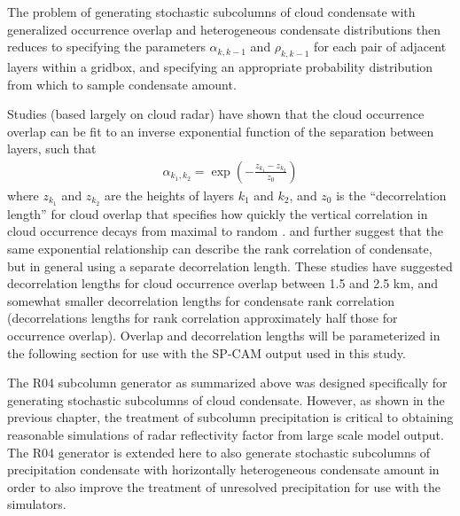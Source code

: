 The problem of generating stochastic subcolumns of cloud condensate with
generalized occurrence overlap and heterogeneous condensate
distributions then reduces to specifying the parameters
\(\alpha_{k, k-1}\) and \(\rho_{k, k-1}\) for each pair of adjacent
layers within a gridbox, and specifying an appropriate probability
distribution from which to sample condensate amount.

Studies (based largely on cloud radar) have shown that the cloud
occurrence overlap can be fit to an inverse exponential function of the
separation between layers, such that \begin{equation}\begin{gathered} 
    \alpha_{k_1, k_2} = \exp\left(-\frac{z_{k_1} - z_{k_2}}{z_0}\right) 
\end{gathered}\label{eq:alphaExponential}\end{equation} where
\(z_{k_1}\) and \(z_{k_2}\) are the heights of layers \(k_1\) and
\(k_2\), and \(z_0\) is the ``decorrelation length'' for cloud overlap
that specifies how quickly the vertical correlation in cloud occurrence
decays from maximal to random
\citep{hogan_and_illingworth_2000, mace_and_benson-troth_2002, raisanen_et_al_2004, pincus_et_al_2005, barker_2008, tompkins_and_digiuseppe_2015}.
\citet{raisanen_et_al_2004} and \citet{pincus_et_al_2005} further
suggest that the same exponential relationship can describe the rank
correlation of condensate, but in general using a separate decorrelation
length. These studies have suggested decorrelation lengths for cloud
occurrence overlap between 1.5 and 2.5 km, and somewhat smaller
decorrelation lengths for condensate rank correlation (decorrelations
lengths for rank correlation approximately half those for occurrence
overlap). Overlap and decorrelation lengths will be parameterized in the
following section for use with the SP-CAM output used in this study.

The R04 subcolumn generator as summarized above was designed
specifically for generating stochastic subcolumns of cloud condensate.
However, as shown in the previous chapter, the treatment of subcolumn
precipitation is critical to obtaining reasonable simulations of radar
reflectivity factor from large scale model output. The R04 generator is
extended here to also generate stochastic subcolumns of precipitation
condensate with horizontally heterogeneous condensate amount in order to
also improve the treatment of unresolved precipitation for use with the
simulators.


